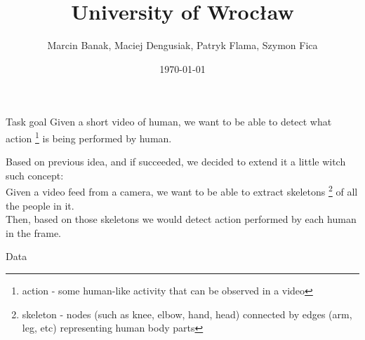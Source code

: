 \documentclass[aspectratio=169]{beamer}
\title[Tracking human skeletons]{University of Wrocław}
\author[SomeUWrTeam]{Marcin Banak, Maciej Dengusiak, Patryk Flama, Szymon Fica}
\date{\today}
\begin{document}





\begin{frame}[plain]
\end{frame}




\begin{frame}{Task goal}
Given a short video of human, we want to be able to detect what action \footnote{action - some human-like activity that can be observed in a video} is being performed by human.

\vspace{5mm}

Based on previous idea, and if succeeded, we decided to extend it a little witch such concept:\\
Given a video feed from a camera, we want to be able to extract skeletons \footnote{skeleton - nodes (such as knee, elbow, hand, head) connected by edges (arm, leg, etc) representing human body parts} of all the people in it. \\
Then, based on those skeletons we would detect action performed by each human in the frame.
\end{frame}

\begin{frame}[t]{Data}

\end{frame}
\end{document}
